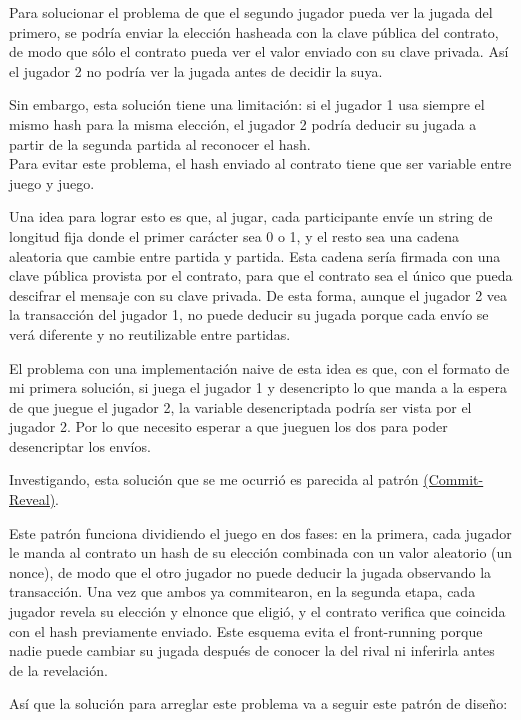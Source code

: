 \documentclass[12pt]{article}
\begin{document}
Para solucionar el problema de que el segundo jugador pueda ver la jugada del primero, se podría enviar la elección hasheada con la clave pública del contrato, de modo que sólo el contrato pueda ver el valor enviado con su clave privada. Así el jugador 2 no podría ver la jugada antes de decidir la suya.

Sin embargo, esta solución tiene una limitación: si el jugador 1 usa siempre el mismo hash para la misma elección, el jugador 2 podría deducir su jugada a partir de la segunda partida al reconocer el hash.\\
Para evitar este problema, el hash enviado al contrato tiene que ser variable entre juego y juego.

Una idea para lograr esto es que, al jugar, cada participante envíe un string de longitud fija donde el primer carácter sea 0 o 1, y el resto sea una cadena aleatoria que cambie entre partida y partida. Esta cadena sería firmada con una clave pública provista por el contrato, para que el contrato sea el único que pueda descifrar el mensaje con su clave privada. 
De esta forma, aunque el jugador 2 vea la transacción del jugador 1, no puede deducir su jugada porque cada envío se verá diferente y no reutilizable entre partidas.

El problema con una implementación naive de esta idea es que, con el formato de mi primera solución, si juega el jugador 1 y desencripto lo que manda a la espera de que juegue el jugador 2, la variable desencriptada podría ser vista por el jugador 2. Por lo que necesito esperar a que jueguen los dos para poder desencriptar los envíos.

Investigando, esta solución que se me ocurrió es parecida al patrón \href{https://medium.com/coinmonks/commit-reveal-scheme-in-solidity-c06eba4091bb}{(Commit-Reveal)}. 

Este patrón funciona dividiendo el juego en dos fases: en la primera, cada jugador le manda al contrato un hash de su elección combinada con un valor aleatorio (un nonce), de modo que el otro jugador no puede deducir la jugada observando la transacción. Una vez que ambos ya commitearon, en la segunda etapa, cada jugador revela su elección y elnonce que eligió, y el contrato verifica que coincida con el hash previamente enviado. Este esquema evita el front-running porque nadie puede cambiar su jugada después de conocer la del rival ni inferirla antes de la revelación.

Así que la solución para arreglar este problema va a seguir este patrón de diseño:
\end{document}
